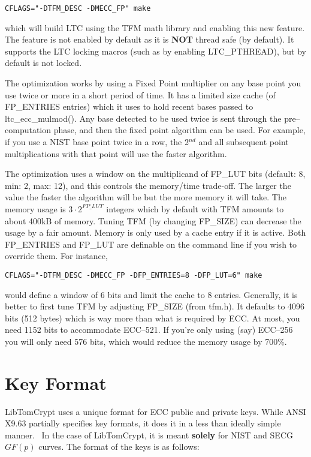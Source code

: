 \documentclass[synpaper]{book}
\newcommand{\mysection}[1]    %
	{                   %
	\section{#1}
   \markboth{\textsf{www.libtom.net}}{\thesection ~ {#1}}
	}
\begin{document}
\begin{verbatim}
CFLAGS="-DTFM_DESC -DMECC_FP" make
\end{verbatim}

which will build LTC using the TFM math library and enabling this new feature.  The feature is not enabled by default as it is \textbf{NOT} thread
safe (by default).  It supports the LTC locking macros (such as by enabling LTC\_PTHREAD), but by default is not locked.

The optimization works by using a Fixed Point multiplier on any base point you use twice or more in a short period of time.  It has a limited size
cache (of FP\_ENTRIES entries) which it uses to hold recent bases passed to ltc\_ecc\_mulmod().  Any base detected to be used twice is sent through the
pre--computation phase, and then the fixed point algorithm can be used.  For example, if you use a NIST base point twice in a row, the 2$^{nd}$ and
all subsequent point multiplications with that point will use the faster algorithm.

The optimization uses a window on the multiplicand of FP\_LUT bits (default: 8, min: 2, max: 12), and this controls the memory/time trade-off. The larger the
value the faster the algorithm will be but the more memory it will take.  The memory usage is $3 \cdot 2^{FP\_LUT}$ integers which by default
with TFM amounts to about 400kB of memory.  Tuning TFM (by changing FP\_SIZE) can decrease the usage by a fair amount.  Memory is only used by a cache entry
if it is active.  Both FP\_ENTRIES and FP\_LUT are definable on the command line if you wish to override them. For instance,

\begin{verbatim}
CFLAGS="-DTFM_DESC -DMECC_FP -DFP_ENTRIES=8 -DFP_LUT=6" make
\end{verbatim}

\begin{flushleft}
  
would define a window of 6 bits and limit the cache to 8 entries.  Generally, it is better to first tune TFM by adjusting FP\_SIZE (from tfm.h).  It defaults
to 4096 bits (512 bytes) which is way more than what is required by ECC.  At most, you need 1152 bits to accommodate ECC--521.  If you're only using (say)
ECC--256 you will only need 576 bits, which would reduce the memory usage by 700\%.
\end{flushleft}

\mysection{Key Format}
LibTomCrypt uses a unique format for ECC public and private keys.  While ANSI X9.63 partially specifies key formats, it does it in a less than ideally simple manner.  \
In the case of LibTomCrypt, it is meant \textbf{solely} for NIST and SECG $GF(p)$ curves.  The format of the keys is as follows:
\end{document}
